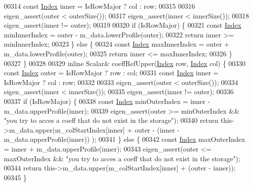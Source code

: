 \begin{DoxyCode}
00314         \textcolor{keyword}{const} \hyperlink{namespace_eigen_a62e77e0933482dafde8fe197d9a2cfde}{Index} inner = IsRowMajor ? col : row;
00315 
00316         eigen\_assert(outer < outerSize());
00317         eigen\_assert(inner < innerSize());
00318         eigen\_assert(inner != outer);
00319 
00320         \textcolor{keywordflow}{if} (IsRowMajor) \{
00321             \textcolor{keyword}{const} \hyperlink{namespace_eigen_a62e77e0933482dafde8fe197d9a2cfde}{Index} minInnerIndex = outer - m\_data.lowerProfile(outer);
00322             \textcolor{keywordflow}{return} inner >= minInnerIndex;
00323         \} \textcolor{keywordflow}{else} \{
00324             \textcolor{keyword}{const} \hyperlink{namespace_eigen_a62e77e0933482dafde8fe197d9a2cfde}{Index} maxInnerIndex = outer + m\_data.lowerProfile(outer);
00325             \textcolor{keywordflow}{return} inner <= maxInnerIndex;
00326         \}
00327     \}
00328 
00329     \textcolor{keyword}{inline} Scalar& coeffRefUpper(\hyperlink{namespace_eigen_a62e77e0933482dafde8fe197d9a2cfde}{Index} row, \hyperlink{namespace_eigen_a62e77e0933482dafde8fe197d9a2cfde}{Index} col) \{
00330         \textcolor{keyword}{const} \hyperlink{namespace_eigen_a62e77e0933482dafde8fe197d9a2cfde}{Index} outer = IsRowMajor ? row : col;
00331         \textcolor{keyword}{const} \hyperlink{namespace_eigen_a62e77e0933482dafde8fe197d9a2cfde}{Index} inner = IsRowMajor ? col : row;
00332 
00333         eigen\_assert(outer < outerSize());
00334         eigen\_assert(inner < innerSize());
00335         eigen\_assert(inner != outer);
00336 
00337         \textcolor{keywordflow}{if} (IsRowMajor) \{
00338             \textcolor{keyword}{const} \hyperlink{namespace_eigen_a62e77e0933482dafde8fe197d9a2cfde}{Index} minOuterIndex = inner - m\_data.upperProfile(inner);
00339             eigen\_assert(outer >= minOuterIndex && \textcolor{stringliteral}{"you try to acces a coeff that do not exist in the
       storage"});
00340             \textcolor{keywordflow}{return} this->m\_data.upper(m\_colStartIndex[inner] + outer - (inner - m\_data.upperProfile(inner))
      );
00341         \} \textcolor{keywordflow}{else} \{
00342             \textcolor{keyword}{const} \hyperlink{namespace_eigen_a62e77e0933482dafde8fe197d9a2cfde}{Index} maxOuterIndex = inner + m\_data.upperProfile(inner);
00343             eigen\_assert(outer <= maxOuterIndex && \textcolor{stringliteral}{"you try to acces a coeff that do not exist in the
       storage"});
00344             \textcolor{keywordflow}{return} this->m\_data.upper(m\_colStartIndex[inner] + (outer - inner));
00345         \}

\end{DoxyCode}
